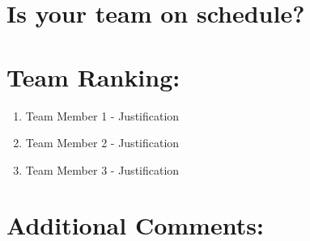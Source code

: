 \documentclass{article}
\begin{document}





\section{Is your team on schedule?}








\section{Team Ranking:}
\begin{enumerate}
  \item Team Member 1 - Justification
  \item Team Member 2 - Justification
  \item Team Member 3 - Justification
\end{enumerate}


\section{Additional Comments:}





\end{document}
